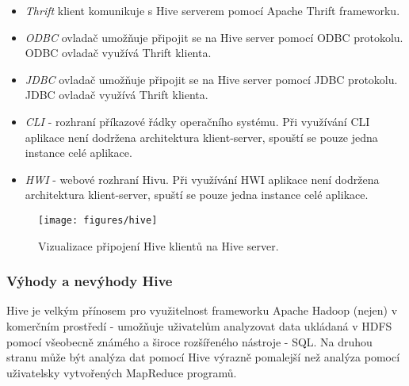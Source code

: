 \documentclass[11pt,twoside,a4paper]{book}
\begin{document}
\begin{itemize}
\item{\textit{Thrift} klient} komunikuje s Hive serverem pomocí Apache Thrift frameworku.\cite{thrift01}
\item{\textit{ODBC} ovladač} umožňuje připojit se na Hive server pomocí ODBC protokolu. ODBC ovladač využívá Thrift klienta.  
\item{\textit{JDBC} ovladač} umožňuje připojit se na Hive server pomocí JDBC protokolu. JDBC ovladač využívá Thrift klienta.
\item{\textit{CLI} - rozhraní příkazové řádky operačního systému. Při využívání CLI aplikace není dodržena architektura klient-server, spouští se pouze jedna instance celé aplikace.}
\item{\textit{HWI} - webové rozhraní Hivu. Při využívání HWI aplikace není dodržena architektura klient-server, spuští se pouze jedna instance celé aplikace.}
\end{itemize}

\begin{figure}
\begin{center}
\label{fig:hive}
\texttt{[image: figures/hive]}
\caption{Vizualizace připojení Hive klientů na Hive server.\cite{white01}}
\end{center}
\end{figure}
		
			\subsubsection{Výhody a nevýhody Hive}
			Hive je velkým přínosem pro využitelnost frameworku Apache Hadoop (nejen) v komerčním prostředí - umožňuje uživatelům analyzovat data ukládaná v HDFS pomocí všeobecně známého a široce rozšířeného nástroje - SQL. Na druhou stranu může být analýza dat pomocí Hive výrazně pomalejší než analýza pomocí uživatelsky vytvořených MapReduce programů. 
 
\end{document}
